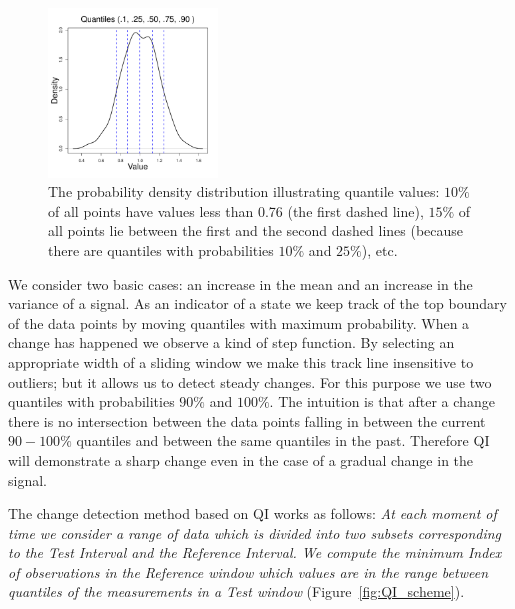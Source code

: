 \begin{figure}[htb!]
\centering
\includegraphics[width=0.4\textwidth]{articles/pics/cfb_paper/QuantileDef}
\caption{The probability density distribution illustrating quantile values: $10\%$ of all points have values less than 0.76 (the first dashed line),
$15\%$ of all points lie between the first and the second dashed lines (because there are quantiles with probabilities $10\%$ and $25\%$), etc.}
\label{fig:PDD_quantile}
\end{figure}

We consider two basic cases: an increase in the mean and an increase in the variance of a signal. 
As an indicator of a state we keep track of the top boundary of the data points by moving quantiles with maximum probability. 
When a change has happened we observe a kind of step function. By selecting an appropriate width of a sliding window we make this track line insensitive to outliers; but it allows us to detect steady changes.
For this purpose we use two quantiles with probabilities $90\%$ and $100\%$.
The intuition is that after a change there is no intersection between the data points falling in between the current $90-100\%$ quantiles and between the same quantiles in the past. Therefore QI will demonstrate a sharp change even in the case of a gradual change in the signal.

The change detection method based on QI works as follows:
\textit{
At each moment of time we consider a range of data which is divided into two subsets corresponding to the Test Interval and the Reference Interval.
We compute the minimum Index of observations in the Reference window which values are in the range between quantiles of the measurements in a Test window} (Figure~\ref{fig:QI_scheme}).

